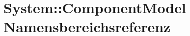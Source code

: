 \hypertarget{namespaceSystem_1_1ComponentModel}{
\section{System::Component\-Model Namensbereichsreferenz}
\label{namespaceSystem_1_1ComponentModel}
}




